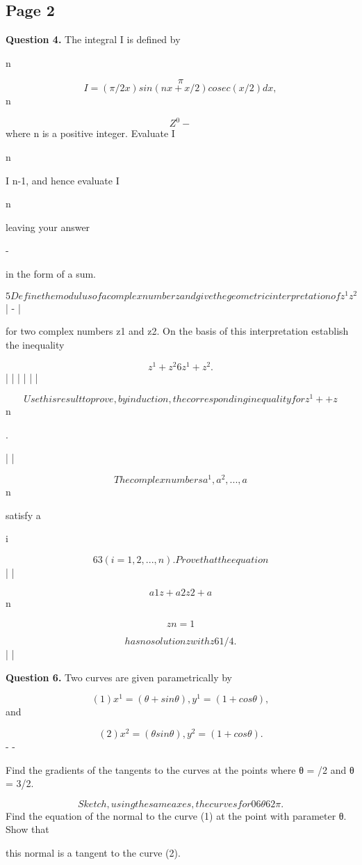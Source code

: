 \documentclass[12pt]{article}
\begin{document}
\subsection*{Page 2}
\begin{flushleft}
\bigskip\textbf{Question 4.} The integral I is defined by\par
n\par
\[\pi\]
\[I = (\pi/2 x) sin(nx + x/2) cosec (x/2) dx,\]
n\par
\[Z^0 -\]
where n is a positive integer. Evaluate I\par
n\par
I n-1, and hence evaluate I\par
n\par
leaving your answer\par
-\par
in the form of a sum.\par
\[5 Define the modulus of a complex number z and give the geometric interpretation of z^1 z^2\]
| - |\par
for two complex numbers z1 and z2. On the basis of this interpretation establish the inequality\par
\[z^1 + z^2 6 z^1 + z^2 .\]
| | | | | |\par
\[Use this result to prove, by induction, the corresponding inequality for z^1 + + z\]
n\par
.\par
| \cdots |\par
\[The complex numbers a^1, a^2, . . . , a\]
n\par
satisfy a\par
i\par
\[6 3 (i = 1, 2, . . . , n). Prove that the equation\]
| |\par
\[a1z + a2z 2 + a\]
n\par
\[zn = 1\]
\cdots\par
\[has no solution z with z 6 1/4.\]
| |\par
\bigskip\textbf{Question 6.} Two curves are given parametrically by\par
\[(1) x^1 = (θ + sin θ), y^1 = (1 + cos θ),\]
and\par
\[(2) x^2 = (θ sin θ), y^2 = (1 + cos θ).\]
- -\par
Find the gradients of the tangents to the curves at the points where θ = \pi/2 and θ = 3\pi/2.\par
\[Sketch, using the same axes, the curves for 0 6 θ 6 2\pi.\]
Find the equation of the normal to the curve (1) at the point with parameter θ. Show that\par
this normal is a tangent to the curve (2).\par
\end{flushleft}
\end{document}
